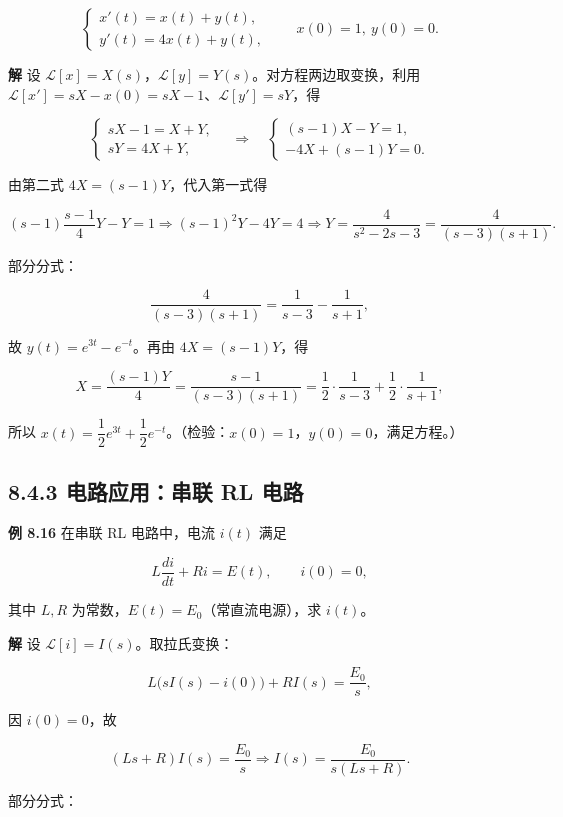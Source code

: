 \[
\begin{cases}
x'(t)=x(t)+y(t),\\
y'(t)=4x(t)+y(t),
\end{cases}
\qquad x(0)=1,\ y(0)=0 .
\]

\textbf{解} 设
\(\mathcal{L}[x]=X(s)\)，\(\mathcal{L}[y]=Y(s)\)。对方程两边取变换，利用
\(\mathcal{L}[x']=sX-x(0)=sX-1\)、\(\mathcal{L}[y']=sY\)，得

\[
\begin{cases}
sX-1=X+Y,\\
sY=4X+Y,
\end{cases}
\quad\Longrightarrow\quad
\begin{cases}
(s-1)X-Y=1,\\
-4X+(s-1)Y=0 .
\end{cases}
\]

由第二式 \(4X=(s-1)Y\)，代入第一式得

\[
(s-1)\frac{s-1}{4}Y-Y=1
\Rightarrow (s-1)^2Y-4Y=4
\Rightarrow Y=\frac{4}{s^2-2s-3}=\frac{4}{(s-3)(s+1)}.
\]

部分分式：

\[
\frac{4}{(s-3)(s+1)}=\frac{1}{s-3}-\frac{1}{s+1},
\]

故 \(y(t)=e^{3t}-e^{-t}\)。再由 \(4X=(s-1)Y\)，得

\[
X=\frac{(s-1)Y}{4}=\frac{s-1}{(s-3)(s+1)}
=\frac{1}{2}\cdot\frac{1}{s-3}+\frac{1}{2}\cdot\frac{1}{s+1},
\]

所以
\(x(t)=\dfrac{1}{2}e^{3t}+\dfrac{1}{2}e^{-t}\)。（检验：\(x(0)=1\)，\(y(0)=0\)，满足方程。）

\subsection{8.4.3 电路应用：串联 RL
电路}\label{ux7535ux8defux5e94ux7528ux4e32ux8054-rl-ux7535ux8def}

\textbf{例 8.16} 在串联 RL 电路中，电流 \(i(t)\) 满足

\[
L\frac{di}{dt}+Ri=E(t),\qquad i(0)=0 ,
\]

其中 \(L,R\) 为常数，\(E(t)=E_0\)（常直流电源），求 \(i(t)\)。

\textbf{解} 设 \(\mathcal{L}[i]=I(s)\)。取拉氏变换：

\[
L\bigl(sI(s)-i(0)\bigr)+R I(s)=\frac{E_0}{s},
\]

因 \(i(0)=0\)，故

\[
(Ls+R)I(s)=\frac{E_0}{s}
\Rightarrow I(s)=\frac{E_0}{s(Ls+R)} .
\]

部分分式：

